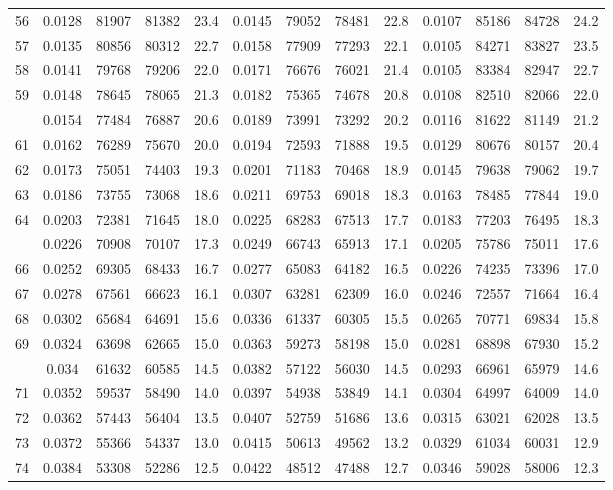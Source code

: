 \documentclass[
  14pt,
]{article}
\begin{document}
\begin{longtable}[t]{lcccccccccccc}
56 & 0.0128 & 81907 & 81382 & 23.4 & 0.0145 & 79052 & 78481 & 22.8 & 0.0107 & 85186 & 84728 & 24.2\\
57 & 0.0135 & 80856 & 80312 & 22.7 & 0.0158 & 77909 & 77293 & 22.1 & 0.0105 & 84271 & 83827 & 23.5\\
58 & 0.0141 & 79768 & 79206 & 22.0 & 0.0171 & 76676 & 76021 & 21.4 & 0.0105 & 83384 & 82947 & 22.7\\
59 & 0.0148 & 78645 & 78065 & 21.3 & 0.0182 & 75365 & 74678 & 20.8 & 0.0108 & 82510 & 82066 & 22.0\\
\addlinespace
60 & 0.0154 & 77484 & 76887 & 20.6 & 0.0189 & 73991 & 73292 & 20.2 & 0.0116 & 81622 & 81149 & 21.2\\
61 & 0.0162 & 76289 & 75670 & 20.0 & 0.0194 & 72593 & 71888 & 19.5 & 0.0129 & 80676 & 80157 & 20.4\\
62 & 0.0173 & 75051 & 74403 & 19.3 & 0.0201 & 71183 & 70468 & 18.9 & 0.0145 & 79638 & 79062 & 19.7\\
63 & 0.0186 & 73755 & 73068 & 18.6 & 0.0211 & 69753 & 69018 & 18.3 & 0.0163 & 78485 & 77844 & 19.0\\
64 & 0.0203 & 72381 & 71645 & 18.0 & 0.0225 & 68283 & 67513 & 17.7 & 0.0183 & 77203 & 76495 & 18.3\\
\addlinespace
65 & 0.0226 & 70908 & 70107 & 17.3 & 0.0249 & 66743 & 65913 & 17.1 & 0.0205 & 75786 & 75011 & 17.6\\
66 & 0.0252 & 69305 & 68433 & 16.7 & 0.0277 & 65083 & 64182 & 16.5 & 0.0226 & 74235 & 73396 & 17.0\\
67 & 0.0278 & 67561 & 66623 & 16.1 & 0.0307 & 63281 & 62309 & 16.0 & 0.0246 & 72557 & 71664 & 16.4\\
68 & 0.0302 & 65684 & 64691 & 15.6 & 0.0336 & 61337 & 60305 & 15.5 & 0.0265 & 70771 & 69834 & 15.8\\
69 & 0.0324 & 63698 & 62665 & 15.0 & 0.0363 & 59273 & 58198 & 15.0 & 0.0281 & 68898 & 67930 & 15.2\\
\addlinespace
70 & 0.034 & 61632 & 60585 & 14.5 & 0.0382 & 57122 & 56030 & 14.5 & 0.0293 & 66961 & 65979 & 14.6\\
71 & 0.0352 & 59537 & 58490 & 14.0 & 0.0397 & 54938 & 53849 & 14.1 & 0.0304 & 64997 & 64009 & 14.0\\
72 & 0.0362 & 57443 & 56404 & 13.5 & 0.0407 & 52759 & 51686 & 13.6 & 0.0315 & 63021 & 62028 & 13.5\\
73 & 0.0372 & 55366 & 54337 & 13.0 & 0.0415 & 50613 & 49562 & 13.2 & 0.0329 & 61034 & 60031 & 12.9\\
74 & 0.0384 & 53308 & 52286 & 12.5 & 0.0422 & 48512 & 47488 & 12.7 & 0.0346 & 59028 & 58006 & 12.3\\

\end{longtable}
\end{document}
